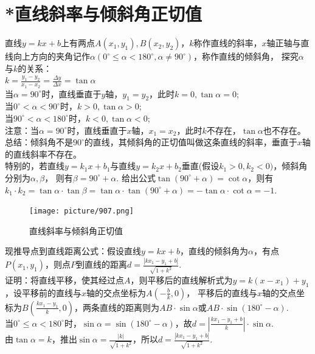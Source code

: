 \documentclass{ecnuthesis}
\begin{document}
\section{*直线斜率与倾斜角正切值}
\begin{knowledge}
    直线$y=kx+b$上有两点$A(x_1,y_1),B(x_2,y_2)$，$k$称作直线的斜率，$x$轴正轴与直线向上方向的夹角记作$\alpha(0^\circ \le \alpha < 180^\circ,\alpha \ne 90^\circ)$，称作直线的倾斜角，
    探究$\alpha$与$k$的关系：\\
    $k=\frac{y_1-y_2}{x_1-x_2}=\frac{\Delta y}{\Delta x}=\tan \alpha$ \\
    当$\alpha=90^\circ$时，直线垂直于$y$轴，$y_1=y_2$，此时$k=0,\tan \alpha=0$;\\
    当$0^\circ<\alpha<90^\circ$时，$k>0,\tan \alpha>0$; \\
    当$90^\circ<\alpha<180^\circ$时，$k<0,\tan \alpha<0$; \\
    注意：当$\alpha=90^\circ$时，直线垂直于$x$轴，$x_1=x_2$，此时$k$不存在，$\tan \alpha$也不存在。\\
    总结：倾斜角不是$90^\circ$的直线，其倾斜角的正切值叫做这条直线的斜率，垂直于$x$轴的直线斜率不存在。\\
    特别的，若直线$y=k_1x+b_1$与直线$y=k_2x+b_2$垂直(假设$k_1>0,k_2<0)$，倾斜角分别为$\alpha,\beta$，
    则有$\beta = 90^\circ + \alpha$.
    给出公式$\tan(90^\circ+\alpha)=\cot \alpha$，则有$k_1·k_2=\tan\alpha·\tan\beta=\tan\alpha·\tan(90^\circ+\alpha)=-\tan\alpha·\cot\alpha=-1$.
\end{knowledge}
\begin{figure}[H]
\centering
\texttt{[image: picture/907.png]}
\caption{直线斜率与倾斜角正切值}
\end{figure}
\begin{knowledge}
    现推导点到直线距离公式：假设直线$y=kx+b$，直线的倾斜角为$\alpha$，有点$P(x_1,y_1)$，则点$P$到直线的距离$d=\frac{|kx_1-y_1+b|}{\sqrt{1+k^2}}$. \\
    证明：将直线平移，使其经过点$A$，则平移后的直线解析式为$y=k(x-x_1)+y_1$，设平移前的直线与$x$轴的交点坐标为$A(-\frac{b}{k},0)$，
    平移后的直线与$x$轴的交点坐标为$B(\frac{kx_1-y_1}{k},0)$，两条直线的距离则为$AB·\sin \alpha$或$AB·\sin(180^\circ-\alpha)$. \\
    当$0^\circ \le \alpha < 180 ^\circ$时，$\sin \alpha = \sin(180^\circ-\alpha)$，故$d=|\frac{kx_1-y_1+b}{k}|·\sin \alpha$. \\
    由$\tan \alpha = k $，推出$\sin \alpha = \frac{|k|}{\sqrt{1+k^2}}$，所以$d=\frac{|kx_1-y_1+b|}{\sqrt{1+k^2}}$.
\end{knowledge}
\clearpage
\end{document}

